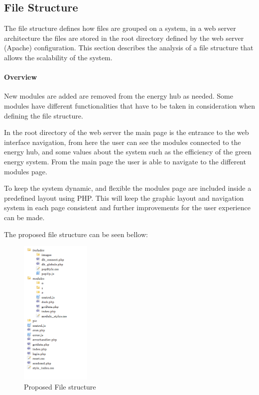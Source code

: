 \subsection{File Structure}
The file structure defines how files are grouped on a system, in a web server architecture the files are stored in the root directory defined by the web server (Apache) configuration. This section describes the analysis of a file structure that allows the scalability of the system.

\paragraph{Overview}
New modules are added are removed from the energy hub as needed. Some modules have different functionalities that have to be taken in consideration when defining the file structure.

In the root directory of the web server the main page is the entrance to the web interface navigation, from here the user can see the modules connected to the energy hub, and some values about the system such as the efficiency of the green energy system. From the main page the user is able to navigate to the different modules page.

To keep the system dynamic, and flexible the modules page are included inside a predefined layout using PHP. This will keep the graphic layout and navigation system in each page consistent and further improvements for the user experience can be made.

The proposed file structure can be seen bellow:
\begin{figure}[H]
	\begin{centering}
		\includegraphics[width=0.3\textwidth]{images/file_structure.png}
		\caption{Proposed File structure}
	\end{centering}
\end{figure}

